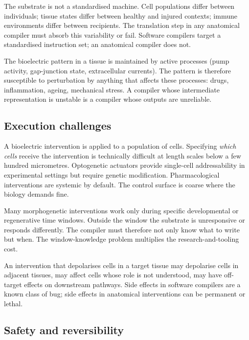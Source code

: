  The substrate is not a standardised
machine. Cell populations differ between individuals; tissue states
differ between healthy and injured contexts; immune environments differ
between recipients. The translation step in any anatomical compiler
must absorb this variability or fail. Software compilers target a
standardised instruction set; an anatomical compiler does not.

 The bioelectric pattern in a tissue is
maintained by active processes (pump activity, gap-junction state,
extracellular currents). The pattern is therefore susceptible to
perturbation by anything that affects these processes: drugs,
inflammation, ageing, mechanical stress. A compiler whose intermediate
representation is unstable is a compiler whose outputs are unreliable.

\subsection{Execution challenges}

 A bioelectric intervention is
applied to a population of cells. Specifying \textit{which cells}
receive the intervention is technically difficult at length scales
below a few hundred micrometres. Optogenetic actuators provide
single-cell addressability in experimental settings but require genetic
modification. Pharmacological interventions are systemic by default.
The control surface is coarse where the biology demands fine.

 Many morphogenetic interventions work
only during specific developmental or regenerative time windows.
Outside the window the substrate is unresponsive or responds
differently. The compiler must therefore not only know what to write
but when. The window-knowledge problem multiplies the
research-and-tooling cost.

 An intervention that depolarises cells in a
target tissue may depolarise cells in adjacent tissues, may affect
cells whose role is not understood, may have off-target effects on
downstream pathways. Side effects in software compilers are a known
class of bug; side effects in anatomical interventions can be permanent
or lethal.

\subsection{Safety and reversibility}

